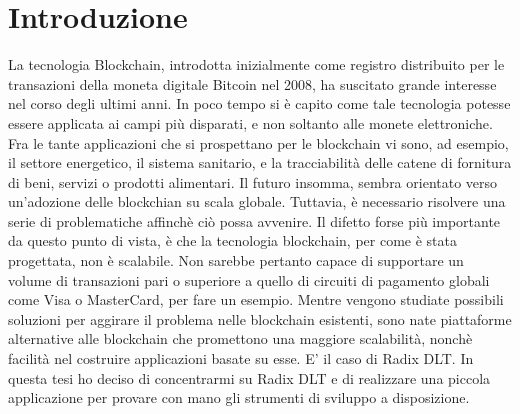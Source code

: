 \chapter*{Introduzione}                 %

La tecnologia Blockchain, introdotta inizialmente come registro distribuito per le transazioni della moneta digitale Bitcoin nel 2008, ha suscitato grande interesse nel corso degli ultimi anni. In poco tempo si è capito come tale tecnologia potesse essere applicata ai campi più disparati, e non soltanto alle monete elettroniche. Fra le tante applicazioni che si prospettano per le blockchain vi sono, ad esempio, il settore energetico, il sistema sanitario, e la tracciabilità delle catene di fornitura di beni, servizi o prodotti alimentari. Il futuro insomma, sembra orientato verso un'adozione delle blockchian su scala globale. Tuttavia, è necessario risolvere una serie di problematiche affinchè ciò possa avvenire. Il difetto forse più importante da questo punto di vista, è che la tecnologia blockchain, per come è stata progettata, non è scalabile. Non sarebbe pertanto capace di supportare un volume di transazioni pari o superiore a quello di circuiti di pagamento globali come Visa o MasterCard, per fare un esempio. Mentre vengono studiate possibili soluzioni per aggirare il problema nelle blockchain esistenti, sono nate piattaforme alternative alle blockchain che promettono una maggiore scalabilità, nonchè facilità nel costruire applicazioni basate su esse. E' il caso di Radix DLT. In questa tesi ho deciso di concentrarmi su Radix DLT e di realizzare una piccola applicazione per provare con mano gli strumenti di sviluppo a disposizione. 

